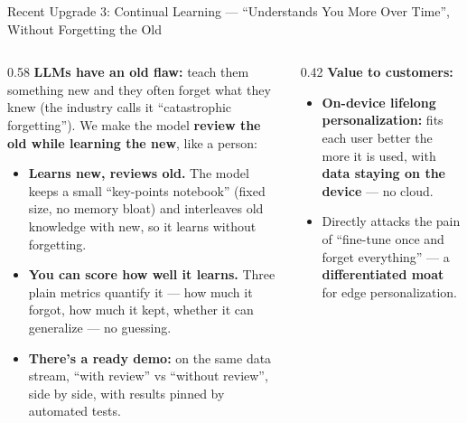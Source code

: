 ﻿\documentclass[aspectratio=169, 10pt]{beamer}
\begin{document}
\begin{frame}{Recent Upgrade 3: Continual Learning --- ``Understands You More Over Time'', Without Forgetting the Old}
\small
\begin{columns}
\begin{column}{0.58\textwidth}
\textbf{LLMs have an old flaw:} teach them something new and they often forget what they knew (the industry calls it ``catastrophic forgetting''). We make the model \textbf{review the old while learning the new}, like a person:
\begin{itemize}\itemsep=0.3em
    \item \textbf{Learns new, reviews old.} The model keeps a small ``key-points notebook'' (fixed size, no memory bloat) and interleaves old knowledge with new, so it learns without forgetting.
    \item \textbf{You can score how well it learns.} Three plain metrics quantify it --- how much it forgot, how much it kept, whether it can generalize --- no guessing.
    \item \textbf{There's a ready demo:} on the same data stream, ``with review'' vs ``without review'', side by side, with results pinned by automated tests.
\end{itemize}
\end{column}
\begin{column}{0.42\textwidth}
\textbf{Value to customers:}
\begin{itemize}\itemsep=0.3em
    \item \textbf{On-device lifelong personalization:} fits each user better the more it is used, with \textbf{data staying on the device} --- no cloud.
    \item Directly attacks the pain of ``fine-tune once and forget everything'' --- a \textbf{differentiated moat} for edge personalization.
\end{itemize}
\end{column}
\end{columns}
\end{frame}
\end{document}
